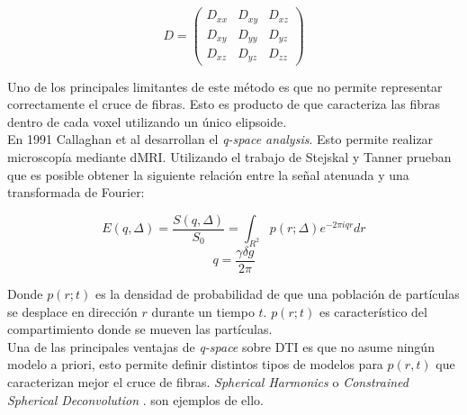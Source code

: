 $$
    D =
    \begin{pmatrix}
             D_{xx} & D_{xy} & D_{xz} \\
             D_{xy} & D_{yy} & D_{yz} \\
             D_{xz} & D_{yz} & D_{zz}    
    \end{pmatrix}
$$

Uno de los principales limitantes de este m\'etodo es que no permite
representar correctamente el cruce de fibras. Esto es producto de que
caracteriza las fibras dentro de cada voxel utilizando un \'unico
elipsoide.\\

En 1991 Callaghan et al \cite{Callaghan1991} desarrollan el 
\textit{q-space analysis}. Esto permite realizar microscop\'ia mediante
dMRI. Utilizando el trabajo de Stejskal y Tanner prueban que es posible
obtener la siguiente relaci\'on entre la se\~nal atenuada y una
transformada de Fourier:

$$E(q,\Delta) =  \frac{S(q,\Delta)}{S_0} = \int_{R^2}{p(r;\Delta)e^{-2\pi i q r} dr} $$
$$ q = \frac{\gamma \delta g}{2\pi} $$

Donde $p(r;t)$ es la densidad de probabilidad de que una poblaci\'on de 
part\'iculas se desplace en direcci\'on $r$ durante un tiempo $t$. $p(r;t)$
es caracter\'istico del compartimiento donde se mueven las part\'iculas. \\

Una de las principales ventajas de \textit{q-space} sobre DTI es que no
asume ning\'un modelo a priori, esto permite definir distintos tipos de
modelos para $p(r,t)$ que caracterizan mejor el cruce de fibras. 
\textit{Spherical Harmonics} \cite{Tuch2004} o 
\textit{Constrained Spherical Deconvolution} \cite{Tournier2004}.
son ejemplos de ello.
